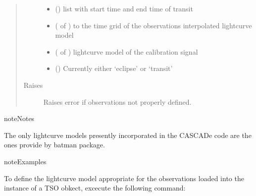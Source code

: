 \documentclass[a4paper,10pt,english]{sphinxmanual}
\begin{document}
\begin{fulllineitems}
\begin{fulllineitems}
\begin{quote}
\begin{description}
\begin{itemize}
\item {} 
 () \textendash{} list with start time and end time of transit

\item {} 
 ( of ) \textendash{} to the time grid of the observations interpolated lightcurve model

\item {} 
 ( of ) \textendash{} lightcurve model of the calibration signal

\item {} 
 () \textendash{} Currently either ‘eclipse’ or ‘transit’

\end{itemize}

\item[{Raises}] \leavevmode
{} \textendash{} Raises error if observations not properly defined.

\end{description}\end{quote}

\begin{sphinxadmonition}{note}{Notes}

The only lightcurve models presently incorporated in the CASCADe code
are the ones provide by batman package.
\end{sphinxadmonition}

\begin{sphinxadmonition}{note}{Examples}

To define the lightcurve model appropriate for the observations
loaded into the instance of a TSO obkect, excecute the
following command:

%
\begin{sphinxVerbatim}[commandchars=\\\{\}]
\end{sphinxVerbatim}
\end{sphinxadmonition}


\end{fulllineitems}
\end{fulllineitems}
\end{document}
